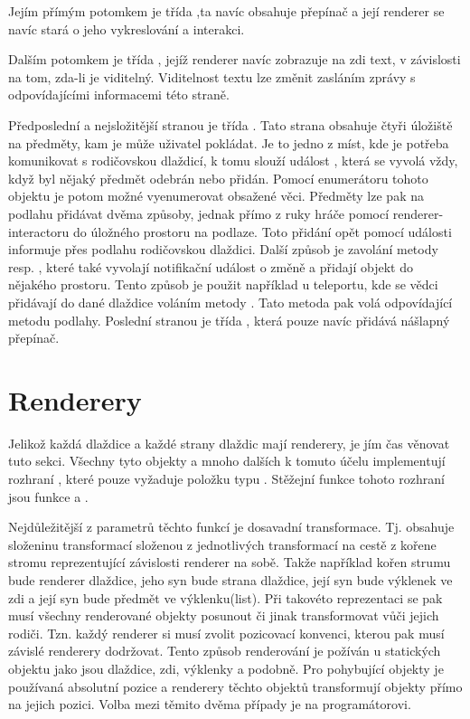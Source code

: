Jejím přímým potomkem je třída ,ta navíc obsahuje přepínač a její renderer se navíc
stará o jeho vykreslování a interakci.

Dalším potomkem je třída , jejíž renderer navíc zobrazuje na zdi text, v závislosti na tom,
zda-li je viditelný. Viditelnost textu lze změnit zasláním zprávy s odpovídajícími informacemi této straně.

Předposlední a nejsložitější stranou je třída  .  Tato strana obsahuje čtyři úložiště na předměty,
kam je může uživatel pokládat. Je to jedno z míst, kde je potřeba komunikovat s rodičovskou dlaždicí, k tomu
slouží událost , která se vyvolá vždy, když byl nějaký předmět odebrán nebo přidán.
Pomocí enumerátoru tohoto objektu je potom možné vyenumerovat obsažené věci. Předměty lze pak na podlahu přidávat dvěma 
způsoby, jednak přímo z ruky hráče pomocí renderer-interactoru do úložného prostoru na podlaze. Toto
přidání opět pomocí události informuje přes podlahu rodičovskou dlaždici. Další způsob je zavolání metody 
 resp. ,  které také vyvolají notifikační událost o změně a přidají objekt do nějakého prostoru.
Tento způsob je použit například u teleportu, kde se vědci přidávají do dané dlaždice voláním metody .
Tato metoda pak volá odpovídající metodu podlahy. Poslední stranou je  třída , která pouze navíc přidává 
nášlapný přepínač.

\section{Renderery}
Jelikož každá dlaždice a každé strany dlaždic mají renderery, je jím čas věnovat tuto sekci. Všechny tyto objekty
a mnoho dalších k tomuto účelu implementují rozhraní , které pouze vyžaduje  položku typu . 
Stěžejní funkce tohoto rozhraní jsou funkce  a . 

Nejdůležitější z parametrů těchto funkcí je dosavadní transformace. Tj. obsahuje složeninu transformací složenou z jednotlivých
transformací na cestě z kořene stromu reprezentující závislosti renderer na sobě. Takže například kořen strumu bude renderer
dlaždice, jeho syn bude strana dlaždice, její syn bude výklenek ve zdi a její syn bude předmět ve
výklenku(list). Při takovéto reprezentaci se pak musí všechny renderované objekty posunout či jinak transformovat vůči jejich rodiči.
Tzn. každý renderer si musí zvolit pozicovací konvenci, kterou pak musí závislé renderery dodržovat. Tento způsob renderování je požíván u statických objektu jako
jsou dlaždice, zdi, výklenky a podobně. Pro pohybující objekty je používaná absolutní pozice a renderery
těchto objektů transformují objekty přímo na jejich pozici. Volba mezi těmito dvěma případy je na programátorovi.

